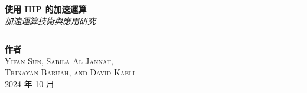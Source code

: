 \begin{titlepage}


\vspace{2.5cm}
\parbox[l]{.9\textwidth}{\centering
    {\HUGE \bfseries 使用 HIP 的加速運算}\\[2\baselineskip]
    {\Large \textit{加速運算技術與應用研究}}\\[.5\baselineskip]}

\vspace*{\fill}

\parbox[b]{.5\textwidth}{
    \rule{1pt}{.125\textheight}
    \hspace{0.025\textwidth}
    \parbox[b]{.8\textwidth}{
        {\Large \bfseries 作者}\\[1\baselineskip]
        {\Large \textsc{Yifan Sun, Sabila Al Jannat, \\ Trinayan Baruah, and David Kaeli}}\\[2\baselineskip]
        {\Large 2024 年 10 月}
    }
}

\end{titlepage}

